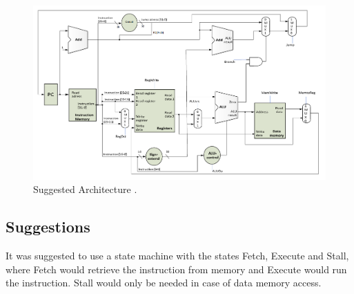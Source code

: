\begin{figure}[ht]
    \centering
    \includegraphics[scale=0.3]{figures/suggestedarchitecture.png}
    \caption{\label{fig:sugarchi}Suggested Architecture \cite[p.115]{lab-compendium}.}
\end{figure}

\subsection{Suggestions}
It was suggested to use a state machine with the states Fetch, Execute and Stall, where Fetch would retrieve the instruction from memory and Execute would run the instruction. Stall would only be needed in case of data memory access.
